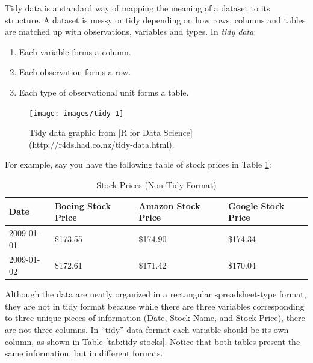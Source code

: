 \documentclass[12pt, krantz2,]{krantz}
\providecommand{\tightlist}{%
  \setlength{\itemsep}{0pt}\setlength{\parskip}{0pt}}
\renewenvironment{quote}{\begin{VF}}{\end{VF}}
\begin{document}
\begin{quote}
Tidy data is a standard way of mapping the meaning of a dataset to its
structure. A dataset is messy or tidy depending on how rows, columns and tables
are matched up with observations, variables and types. In \emph{tidy data}:
\end{quote}

\begin{quote}
\begin{enumerate}
\def\labelenumi{\arabic{enumi}.}
\tightlist
\item
  Each variable forms a column.
\item
  Each observation forms a row.
\item
  Each type of observational unit forms a table.
\end{enumerate}
\end{quote}

\begin{figure}

{\centering \texttt{[image: images/tidy-1]} 

}

\caption{Tidy data graphic from [R for Data Science](http://r4ds.had.co.nz/tidy-data.html).}\label{fig:tidyfig}
\end{figure}

For example, say you have the following table of stock prices in Table \ref{tab:non-tidy-stocks}:

\begin{table}[H]

\caption{\label{tab:non-tidy-stocks}Stock Prices (Non-Tidy Format)}
\centering
\fontsize{10}{12}\selectfont
\begin{tabular}{llll}
\toprule
Date & Boeing Stock Price & Amazon Stock Price & Google Stock Price\\
\midrule
2009-01-01 & \$173.55 & \$174.90 & \$174.34\\
2009-01-02 & \$172.61 & \$171.42 & \$170.04\\
\bottomrule
\end{tabular}
\end{table}

Although the data are neatly organized in a rectangular spreadsheet-type format, they are not in tidy format because while there are three variables corresponding to three unique pieces of information (Date, Stock Name, and Stock Price), there are not three columns. In ``tidy'' data format each variable should be its own column, as shown in Table \ref{tab:tidy-stocks}. Notice that both tables present the same information, but in different formats.
\end{document}
